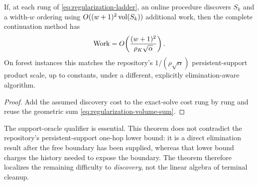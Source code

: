 \begin{corollary}
\label{cor:discovery-reduction}
If, at each rung of \cref{eq:regularization-ladder}, an online procedure
discovers $S_k$ and a width-$w$ ordering using
$O((w+1)^2\operatorname{vol}(S_k))$ additional work, then the complete continuation method
has
\begin{equation}
 \operatorname{Work}
 =O\!\left(\frac{(w+1)^2}{\rho_K\sqrt\alpha}\right).
 \label{eq:end-to-end-support-target}
\end{equation}
On forest instances this matches the repository's
$1/(\rho\sqrt\alpha)$ persistent-support product scale, up to constants,
under a different, explicitly elimination-aware algorithm.
\end{corollary}

\begin{proof}
Add the assumed discovery cost to the exact-solve cost rung by rung and reuse
the geometric sum \cref{eq:regularization-volume-sum}.
\end{proof}

The support-oracle qualifier is essential.  This theorem does not contradict
the repository's persistent-support one-hop lower bound: it is a direct
elimination result after the free boundary has been supplied, whereas that
lower bound charges the history needed to expose the boundary.  The theorem
therefore localizes the remaining difficulty to \emph{discovery}, not the
linear algebra of terminal cleanup.
